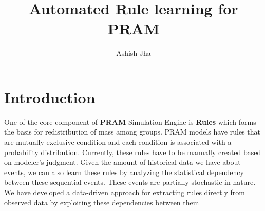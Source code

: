 \documentclass[11pt, a4paper]{article} %
\title{Automated Rule learning for PRAM} %
\author{
Ashish Jha %
  }
\date{} %
\begin{document}
%

\maketitle %



\setcounter{page}{1} %

\section{Introduction} %
One of the core component of \textbf{PRAM} \cite{pram} Simulation Engine is \textbf{Rules} which forms the basis for redistribution of mass among groups. PRAM models have rules that are mutually exclusive condition and each condition is associated with a probability distribution. Currently, these rules have to be manually created based on modeler's judgment. Given the amount of historical data we have about events, we can also learn these rules by analyzing the statistical dependency between these sequential events. These events are partially stochastic in nature. We have developed a data-driven approach for extracting rules directly from observed data by exploiting these dependencies between them


\end{document}
